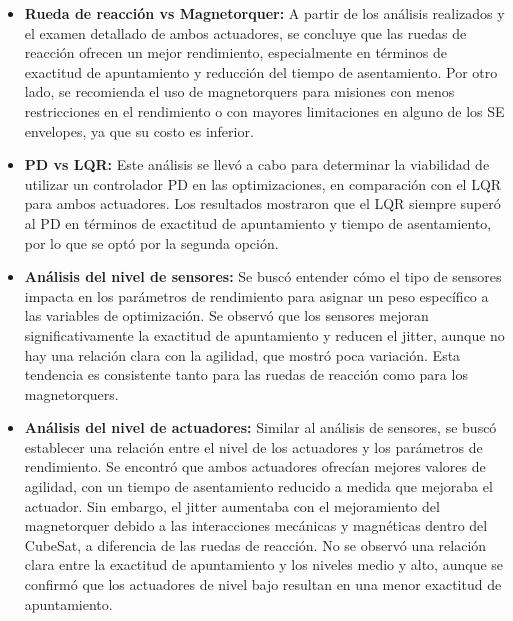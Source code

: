 \begin{itemize}
	\item \textbf{Rueda de reacción vs Magnetorquer:} A partir de los análisis realizados y el examen detallado de ambos actuadores, se concluye que las ruedas de reacción ofrecen un mejor rendimiento, especialmente en términos de exactitud de apuntamiento y reducción del tiempo de asentamiento. Por otro lado, se recomienda el uso de magnetorquers para misiones con menos restricciones en el rendimiento o con mayores limitaciones en alguno de los SE envelopes, ya que su costo es inferior.
	
	\item \textbf{PD vs LQR:} Este análisis se llevó a cabo para determinar la viabilidad de utilizar un controlador PD en las optimizaciones, en comparación con el LQR para ambos actuadores. Los resultados mostraron que el LQR siempre superó al PD en términos de exactitud de apuntamiento y tiempo de asentamiento, por lo que se optó por la segunda opción.
	
	\item \textbf{Análisis del nivel de sensores:} Se buscó entender cómo el tipo de sensores impacta en los parámetros de rendimiento para asignar un peso específico a las variables de optimización. Se observó que los sensores mejoran significativamente la exactitud de apuntamiento y reducen el jitter, aunque no hay una relación clara con la agilidad, que mostró poca variación. Esta tendencia es consistente tanto para las ruedas de reacción como para los magnetorquers.
	
	\item \textbf{Análisis del nivel de actuadores:} Similar al análisis de sensores, se buscó establecer una relación entre el nivel de los actuadores y los parámetros de rendimiento. Se encontró que ambos actuadores ofrecían mejores valores de agilidad, con un tiempo de asentamiento reducido a medida que mejoraba el actuador. Sin embargo, el jitter aumentaba con el mejoramiento del magnetorquer debido a las interacciones mecánicas y magnéticas dentro del CubeSat, a diferencia de las ruedas de reacción. No se observó una relación clara entre la exactitud de apuntamiento y los niveles medio y alto, aunque se confirmó que los actuadores de nivel bajo resultan en una menor exactitud de apuntamiento.
\end{itemize}


